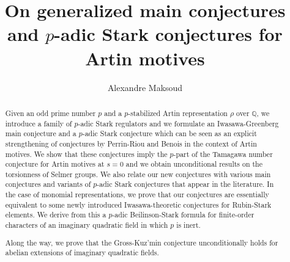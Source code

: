 \documentclass[12pt]{amsart}
\newcommand\bQ{\mathbb{Q}}
\theoremstyle{defstyle}
\theoremstyle{thmstyle}
\begin{document}
\title{On generalized main conjectures and $p$-adic Stark conjectures for Artin motives}
\author{Alexandre Maksoud}
\address{Universität Paderborn, J2.305, Warburger Str. 100, 33098 Paderborn, Germany}

\begin{abstract}
	
		Given an odd prime number $p$ and a $p$-stabilized Artin representation $\rho$ over $\bQ$, we introduce a family of $p$-adic Stark regulators and we formulate an Iwasawa-Greenberg main conjecture and a $p$-adic Stark conjecture which can be seen as an explicit strengthening of conjectures by Perrin-Riou and Benois in the context of Artin motives. 
		We show that these conjectures imply the $p$-part of the Tamagawa number conjecture for Artin motives at $s=0$ and we obtain unconditional results on the torsionness of Selmer groups. We also relate our new conjectures with various main conjectures and variants of $p$-adic Stark conjectures that appear in the literature. 
		In the case of monomial representations, we prove that our conjectures are essentially equivalent to some newly introduced Iwasawa-theoretic conjectures for Rubin-Stark elements. We derive from this a $p$-adic Beilinson-Stark formula for finite-order characters of an imaginary quadratic field in which $p$ is inert. 

Along the way, we prove that the Gross-Kuz'min conjecture unconditionally holds for abelian extensions of imaginary quadratic fields.
\end{abstract}
\maketitle
\end{document}

